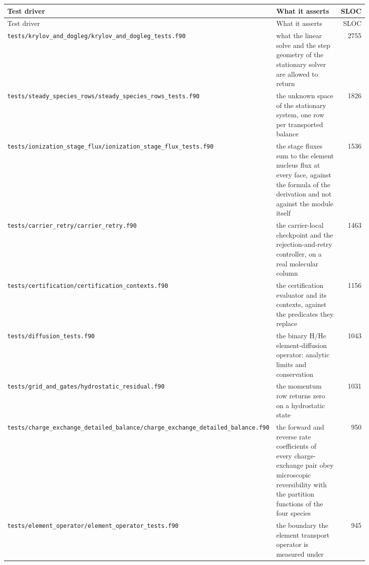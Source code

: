 {\footnotesize
\begin{longtable}{@{}>{\raggedright\arraybackslash}p{0.36\linewidth} >{\raggedright\arraybackslash}p{0.50\linewidth} r@{}}
\toprule
Test driver & What it asserts & SLOC \\
\midrule
\endfirsthead
\toprule
Test driver & What it asserts & SLOC \\
\midrule
\endhead
\texttt{tests/\allowbreak krylov\_\allowbreak and\_\allowbreak dogleg/\allowbreak krylov\_\allowbreak and\_\allowbreak dogleg\_\allowbreak tests.f90} & what the linear solve and the step geometry of the stationary solver are allowed to return & 2755 \\
\texttt{tests/\allowbreak steady\_\allowbreak species\_\allowbreak rows/\allowbreak steady\_\allowbreak species\_\allowbreak rows\_\allowbreak tests.f90} & the unknown space of the stationary system, one row per transported balance & 1826 \\
\texttt{tests/\allowbreak ionization\_\allowbreak stage\_\allowbreak flux/\allowbreak ionization\_\allowbreak stage\_\allowbreak flux\_\allowbreak tests.f90} & the stage fluxes sum to the element nucleus flux at every face, against the formula of the derivation and not against the module itself & 1536 \\
\texttt{tests/\allowbreak carrier\_\allowbreak retry/\allowbreak carrier\_\allowbreak retry.f90} & the carrier-local checkpoint and the rejection-and-retry controller, on a real molecular column & 1463 \\
\texttt{tests/\allowbreak certification/\allowbreak certification\_\allowbreak contexts.f90} & the certification evaluator and its contexts, against the predicates they replace & 1156 \\
\texttt{tests/\allowbreak diffusion\_\allowbreak tests.f90} & the binary H/He element-diffusion operator: analytic limits and conservation & 1043 \\
\texttt{tests/\allowbreak grid\_\allowbreak and\_\allowbreak gates/\allowbreak hydrostatic\_\allowbreak residual.f90} & the momentum row returns zero on a hydrostatic state & 1031 \\
\texttt{tests/\allowbreak charge\_\allowbreak exchange\_\allowbreak detailed\_\allowbreak balance/\allowbreak charge\_\allowbreak exchange\_\allowbreak detailed\_\allowbreak balance.f90} & the forward and reverse rate coefficients of every charge-exchange pair obey microscopic reversibility with the partition functions of the four species & 950 \\
\texttt{tests/\allowbreak element\_\allowbreak operator/\allowbreak element\_\allowbreak operator\_\allowbreak tests.f90} & the boundary the element transport operator is measured under & 945 \\

\end{longtable}}
